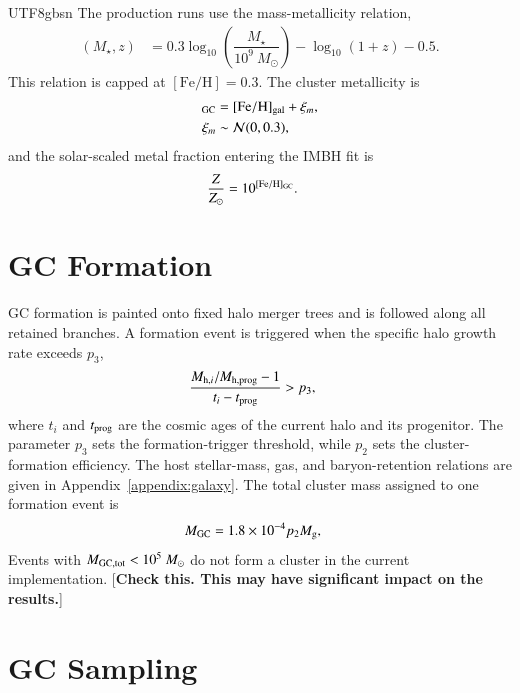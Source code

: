 \documentclass[trackchanges, twocolappendix, twocolumn]{aastex701}
\newcommand{\czkong}[1]{{\color{magenta}[\textbf{#1}]}}
\begin{document}
\begin{CJK*}{UTF8}{gbsn}
The production runs use the \cite{Chen&Gnedin2024aGC} mass-metallicity relation,
\begin{align}
[\mathrm{Fe} / \mathrm{H}] (M_\star, z) & = 0.3 \log_{10} \left( \dfrac{M_\star}{10^9~M_\odot} \right) - \log_{10} (1 + z) - 0.5 .
\label{eq:mass-metal}
\end{align}
This relation is capped at $[\mathrm{Fe}/\mathrm{H}]=0.3$. The cluster metallicity is
\begin{align}
[\mathrm{Fe}/\mathrm{H}]_{\rm GC}
&=[\mathrm{Fe}/\mathrm{H}]_{\rm gal}+\xi_m,\\
\xi_m &\sim {\cal N}(0,0.3),
\end{align}
and the solar-scaled metal fraction entering the IMBH fit is
\begin{align}
\dfrac{Z}{Z_{\odot}} &= 10^{[\mathrm{Fe}/\mathrm{H}]_{\rm GC}}.
\label{eq:metallicity_transfer}
\end{align}

\section{GC Formation}
\label{app:gc_formation}
\label{app:cluster_initial_equations}

GC formation is painted onto fixed halo merger trees and is followed along all retained branches. A formation event is triggered when the specific halo growth rate exceeds $p_3$,
\begin{align}
\dfrac{M_{{\rm h},i}/M_{{\rm h},{\rm prog}}-1}
{t_i-t_{\rm prog}} & > p_3 ,
\label{eq:formation_trigger}
\end{align}
where $t_i$ and $t_{\rm prog}$ are the cosmic ages of the current halo and its progenitor. The parameter $p_3$ sets the formation-trigger threshold, while $p_2$ sets the cluster-formation efficiency. The host stellar-mass, gas, and baryon-retention relations are given in Appendix~\ref{appendix:galaxy}. The total cluster mass assigned to one formation event is
\begin{align}
M_{\rm GC} & = 1.8 \times 10^{-4} p_2 M_{\rm g} ,
\label{eq:gc_total_mass}
\end{align}
Events with $M_{\rm GC, tot}<10^5~M_\odot$ do not form a cluster in the current implementation. \czkong{Check this. This may have significant impact on the results.}

\section{GC Sampling}
\label{app:gc_sampling}
\label{subsect:gc_sampling}


\end{CJK*}
\end{document}
